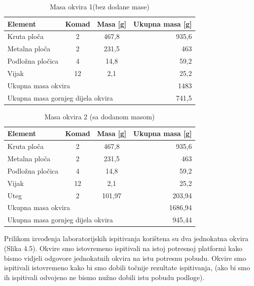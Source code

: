 \documentclass[12pt]{book}
\begin{document}
\begin{table}[H]
	\label{table1}
	\begin{center}
		\begin{tabular}{|l|c|c|r|}
			\hline
			Element & Komad & Masa [g] & Ukupna masa [g]\\
			\hline
			Kruta ploča & 2 & 467,8 & 935,6\\
			\hline
			Metalna ploča & 2 & 231,5 & 463\\
			\hline
			Podložna pločica & 4 & 14,8 & 59,2 \\
			\hline
			Vijak & 12 & 2,1 & 25,2\\
			\hline
			\multicolumn{3}{|l|}{Ukupna masa okvira} & 1483\\
			\hline
			\multicolumn{3}{|l|}{Ukupna masa gornjeg dijela okvira} & 741,5\\
			\hline
		\end{tabular}
	\end{center}
	\caption{Masa okvira 1(bez dodane mase)}
\end{table}


\begin{table}[H]
	\label{table2}
	\begin{center}
		\begin{tabular}{|l|c|c|r|}
			\hline
			Element & Komad & Masa [g] & Ukupna masa [g]\\
			\hline
			Kruta ploča & 2 & 467,8 & 935,6\\
			\hline
			Metalna ploča & 2 & 231,5 & 463\\
			\hline
			Podložna pločica & 4 & 14,8 & 59,2 \\
			\hline
			Vijak & 12 & 2,1 & 25,2\\
			\hline
			Uteg & 2 & 101,97 & 203,94\\
			\hline
			\multicolumn{3}{|l|}{Ukupna masa okvira} & 1686,94\\
			\hline
			\multicolumn{3}{|l|}{Ukupna masa gornjeg dijela okvira} & 945,44\\
			\hline
		\end{tabular}
	\end{center}
	\caption{Masa okvira 2 (sa dodanom masom)}
\end{table}

\newpage

Prilikom izvođenja laboratorijskih ispitivanja korištena su dva jednokatna okvira (Slika 4.5). Okvire smo istovremeno ispitivali na istoj potresnoj platformi kako bismo vidjeli odgovore jednokatnih okvira na istu potresnu pobudu. Okvire smo ispitivali istovremeno kako bi smo dobili točnije rezultate ispitivanja, (ako bi smo ih ispitivali odvojeno ne bismo nužno dobili istu pobudu podloge).
\end{document}
